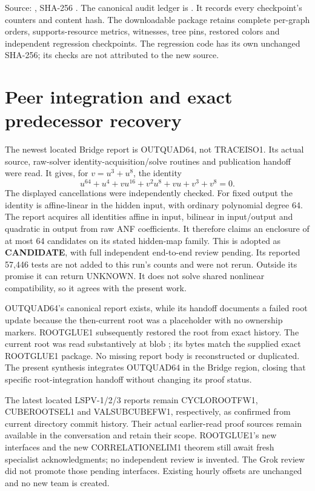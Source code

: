 \documentclass[11pt]{article}
\begin{document}
Source: , SHA-256
. The canonical audit ledger is
. It records every
checkpoint's counters and content hash. The downloadable package retains
complete per-graph orders, supports-resource metrics, witnesses, tree pins,
restored colors and independent regression checkpoints. The regression code
has its own unchanged SHA-256; its checks are not attributed to the new source.

\section{Peer integration and exact predecessor recovery}
The newest located Bridge report is OUTQUAD64, not TRACEISO1. Its actual
source, raw-solver identity-acquisition/solve routines and publication handoff
were read. It gives, for $v=u^3+u^8$, the identity
\[
 u^{64}+u^4+vu^{16}+v^2u^8+vu+v^3+v^8=0.
\]
The displayed cancellations were independently checked. For fixed output the
identity is affine-linear in the hidden input, with ordinary polynomial degree
64. The report acquires all identities affine in input, bilinear in
input/output and quadratic in output from raw ANF coefficients. It therefore
claims an enclosure of at most 64 candidates on its stated hidden-map family.
This is adopted as \textbf{CANDIDATE}, with full independent end-to-end review
pending. Its reported 57,446 tests are not added to this run's counts and were
not rerun. Outside its promise it can return UNKNOWN. It does not solve shared
nonlinear compatibility, so it agrees with the present work.

OUTQUAD64's canonical report exists, while its handoff documents a failed
root update because the then-current root was a placeholder with no ownership
markers. ROOTGLUE1 subsequently restored the root from exact history.
The current root was read substantively at blob
; its bytes match the supplied
exact ROOTGLUE1 package. No missing report body is reconstructed or duplicated.
The present synthesis integrates OUTQUAD64 in the Bridge region, closing that
specific root-integration handoff without changing its proof status.

The latest located LSPV-1/2/3 reports remain CYCLOROOTFW1, CUBEROOTSEL1 and
VALSUBCUBEFW1, respectively, as confirmed from current directory commit
history. Their actual earlier-read proof sources remain available in the
conversation and retain their scope. ROOTGLUE1's new interfaces and the new
CORRELATIONELIM1 theorem still await fresh specialist acknowledgments; no
independent review is invented. The Grok review did not promote those pending
interfaces. Existing hourly offsets are unchanged and no new team is created.
\end{document}
